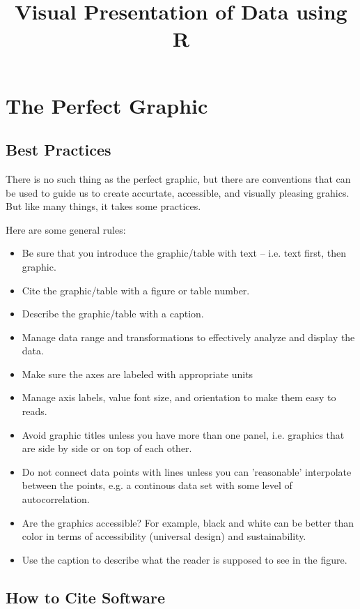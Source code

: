 \documentclass{article}\usepackage[]{graphicx}\usepackage[]{color}
\title{Visual Presentation of Data using R}
\begin{document}
\maketitle

\section{The Perfect Graphic}

\subsection{Best Practices}

There is no such thing as the perfect graphic, but there are conventions that can be used to guide us to create accurtate, accessible, and visually pleasing grahics. But like many things, it takes some practices. 

Here are some general rules:

\begin{itemize}
  \item Be sure that you introduce the graphic/table with text -- i.e. text first, then graphic. 
  \item Cite the graphic/table with a figure or table number. 
  \item Describe the graphic/table with a caption.
  \item Manage data range and transformations to effectively analyze and display the data.
  \item Make sure the axes are labeled with appropriate units
  \item Manage axis labels, value font size, and orientation to make them easy to reads.
  \item Avoid graphic titles unless you have more than one panel, i.e. graphics that are side by side or on top of each other. 
  \item Do not connect data points with lines unless you can 'reasonable' interpolate between the points, e.g. a continous data set with some level of autocorrelation. 
  \item Are the graphics accessible?  For example, black and white can be better than color in terms of accessibility (universal design) and sustainability. 
  \item Use the caption to describe what the reader is supposed to see in the figure. 
\end{itemize}

\subsection{How to Cite Software}
\end{document}
